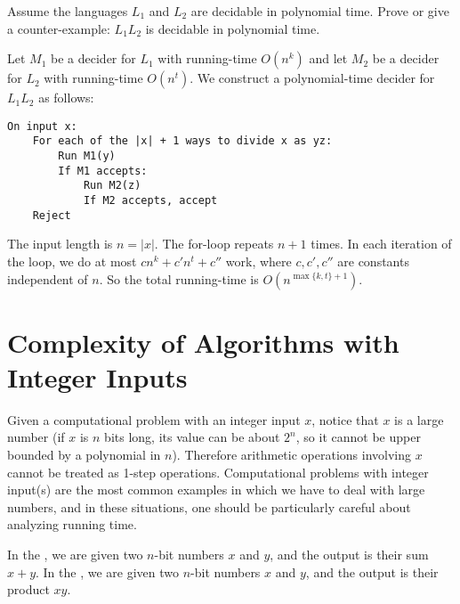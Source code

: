 \begin{flex}
\begin{exercise} \label{exercise:Is-polynomial-time-decidability-closed-under-concatenation}
Assume the languages $L_1$ and $L_2$ are decidable in polynomial time. Prove or give a counter-example: $L_1L_2$ is decidable in polynomial time.
\end{exercise}

\begin{solution}
Let $M_1$ be a decider for $L_1$ with running-time $O(n^k)$ and let $M_2$ be a decider for $L_2$ with running-time $O(n^t)$. We construct a polynomial-time decider for $L_1L_2$ as follows:

\begin{verbatim}
On input x:
    For each of the |x| + 1 ways to divide x as yz:
        Run M1(y)
        If M1 accepts:
            Run M2(z)
            If M2 accepts, accept
    Reject
\end{verbatim}

The input length is $n = |x|$. The for-loop repeats $n+1$ times. In each iteration of the loop, we do at most $cn^k + c'n^t + c''$ work, where $c, c', c''$ are constants independent of $n$. So the total running-time is $O(n^{\max\{k,t\}+1})$.
\end{solution}
\end{flex}




\section{Complexity of Algorithms with Integer Inputs}


\begin{important} \label{important:Integer-inputs-are-large-numbers}
Given a computational problem with an integer input $x$, notice that $x$ is a large number (if $x$ is $n$ bits long, its value can be about $2^n$, so it cannot be upper bounded by a polynomial in $n$). Therefore arithmetic operations involving $x$ cannot be treated as 1-step operations. Computational problems with integer input(s) are the most common examples in which we have to deal with large numbers, and in these situations, one should be particularly careful about analyzing running time.
\end{important}


\begin{definition} \label{definition:Integer-addition-and-integer-multiplication-problems} 
In the , we are given two $n$-bit numbers $x$ and $y$, and the output is their sum $x+y$. In the , we are given two $n$-bit numbers $x$ and $y$, and the output is their product $xy$.
\end{definition}


